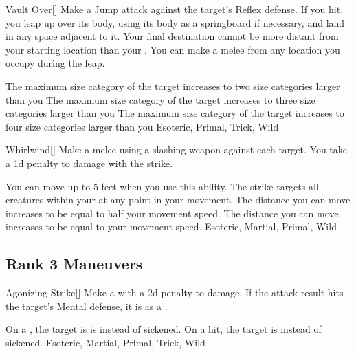 \lowercase{\hypertarget{maneuver:Vault Over}{}}\label{maneuver:Vault Over}
\hypertarget{maneuver:Vault Over}{}
\begin{freeability}[Rank 1]{Vault Over}[]
Make a Jump attack against the target's Reflex defense.
If you hit, you leap up over its body, using its body as a springboard if necessary, and land in any space adjacent to it.
Your final destination cannot be more distant from your starting location than your .
You can make a melee  from any location you occupy during the leap.

\rankline
{} The maximum size category of the target increases to two size categories larger than you
 The maximum size category of the target increases to three size categories larger than you
 The maximum size category of the target increases to four size categories larger than you
 Esoteric, Primal, Trick, Wild
\end{freeability}
\vspace{0.25em}



\lowercase{\hypertarget{maneuver:Whirlwind}{}}\label{maneuver:Whirlwind}
\hypertarget{maneuver:Whirlwind}{}
\begin{freeability}[Rank 1]{Whirlwind}[]
Make a melee  using a slashing weapon against each target.
You take a \minus1d penalty to damage with the strike.

\rankline
{} You can move up to 5 feet when you use this ability.
The strike targets all creatures within your  at any point in your movement.
 The distance you can move increases to be equal to half your movement speed.
 The distance you can move increases to be equal to your movement speed.
 Esoteric, Martial, Primal, Wild
\end{freeability}
\vspace{0.25em}


\subsection{Rank 3 Maneuvers}

\lowercase{\hypertarget{maneuver:Agonizing Strike}{}}\label{maneuver:Agonizing Strike}
\hypertarget{maneuver:Agonizing Strike}{}
\begin{freeability}[Rank 3]{Agonizing Strike}[]
Make a  with a \minus2d penalty to damage.
If the attack result hits the target's Mental defense,
it is  as a .

\rankline
{} On a , the target is is  instead of sickened.
 On a hit, the target is  instead of sickened.
 Esoteric, Martial, Primal, Trick, Wild
\end{freeability}
\vspace{0.25em}



